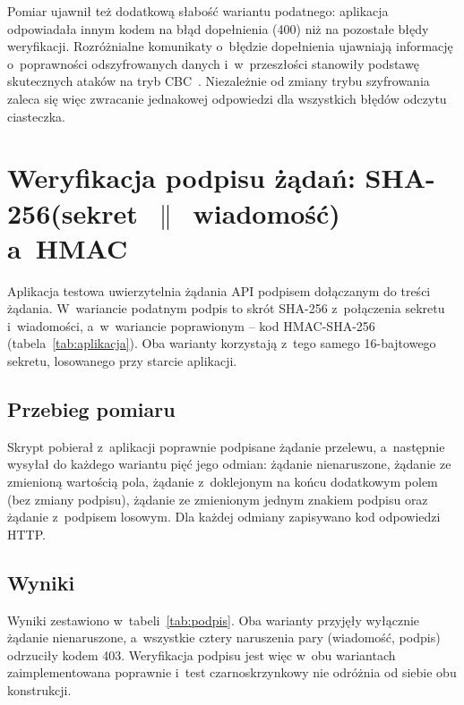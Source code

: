 Pomiar ujawnił też dodatkową słabość wariantu podatnego: aplikacja odpowiadała innym kodem na błąd dopełnienia (400) niż na pozostałe błędy weryfikacji. Rozróżnialne komunikaty o~błędzie dopełnienia ujawniają informację o~poprawności odszyfrowanych danych i~w~przeszłości stanowiły podstawę skutecznych ataków na tryb CBC~\cite{boneh2023}. Niezależnie od zmiany trybu szyfrowania zaleca się więc zwracanie jednakowej odpowiedzi dla wszystkich błędów odczytu ciasteczka.

\section{Weryfikacja podpisu żądań: SHA-256(sekret~$\|$~wiadomość) a~HMAC}\label{sec:lenext}

Aplikacja testowa uwierzytelnia żądania API podpisem dołączanym do treści żądania. W~wariancie podatnym podpis to skrót SHA-256 z~połączenia sekretu i~wiadomości, a~w~wariancie poprawionym -- kod HMAC-SHA-256 (tabela~\ref{tab:aplikacja}). Oba warianty korzystają z~tego samego 16-bajtowego sekretu, losowanego przy starcie aplikacji.

\subsection*{Przebieg pomiaru}

Skrypt  pobierał z~aplikacji poprawnie podpisane żądanie przelewu, a~następnie wysyłał do każdego wariantu pięć jego odmian: żądanie nienaruszone, żądanie ze zmienioną wartością pola, żądanie z~doklejonym na końcu dodatkowym polem (bez zmiany podpisu), żądanie ze zmienionym jednym znakiem podpisu oraz żądanie z~podpisem losowym. Dla każdej odmiany zapisywano kod odpowiedzi HTTP.

\subsection*{Wyniki}

Wyniki zestawiono w~tabeli~\ref{tab:podpis}. Oba warianty przyjęły wyłącznie żądanie nienaruszone, a~wszystkie cztery naruszenia pary (wiadomość, podpis) odrzuciły kodem 403. Weryfikacja podpisu jest więc w~obu wariantach zaimplementowana poprawnie i~test czarnoskrzynkowy nie odróżnia od siebie obu konstrukcji.

